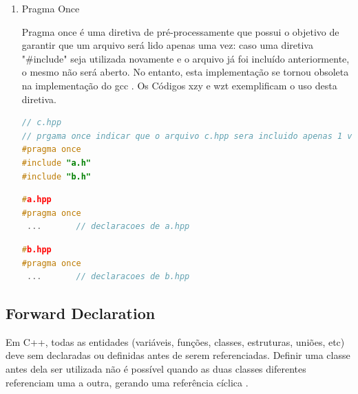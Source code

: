 \begin{enumerate}
\item Pragma Once

Pragma once é uma diretiva de pré-processamente que possui o objetivo de
 garantir que um arquivo será lido apenas uma vez: caso uma diretiva 
"\#include" seja utilizada novamente e o arquivo já foi incluído anteriormente,
 o mesmo não será aberto. No entanto, esta implementação se tornou obsoleta 
 na implementação do gcc \cite{gcc-pragma_once}. Os Códigos xzy e wzt exemplificam o uso 
desta diretiva.



\begin{lstlisting}[language=C++,frame=single,title={Código 10:
                                    Exemplo de arquivo c.hpp com guarda de 
                                         inclusão que utiliza "\#pragma once"},
                                                            label=codigo_10]
// c.hpp
// prgama once indicar que o arquivo c.hpp sera incluido apenas 1 vez
#pragma once            
#include "a.h"
#include "b.h"
\end{lstlisting}
\begin{lstlisting}[language=C++,frame=single,title={Código 11: 
                                   Exemplo de arquivo a.hpp com guarda de 
                                    inclusão que utiliza "\#pragma once"},
                                                            label=codigo_11]
#a.hpp
#pragma once 
 ...       // declaracoes de a.hpp

\end{lstlisting}

\begin{lstlisting}[language=C++,frame=single,title={Código 12: 
                                   Exemplo de arquivo b.hpp com guarda de 
                                      inclusão que utiliza "\#pragma once"},
                                                            label=codigo_12]
#b.hpp
#pragma once 
 ...       // declaracoes de b.hpp

\end{lstlisting}

\end{enumerate}



\subsection{Forward Declaration}\label{forward_declaration_section}

Em C++, todas as entidades (variáveis, funções, classes, estruturas, uniões,
 etc) deve sem declaradas ou definidas antes de serem referenciadas. Definir
 uma classe antes dela ser utilizada não é possível quando as duas classes
 diferentes referenciam uma a outra, gerando uma referência cíclica
\cite{ref43}.

